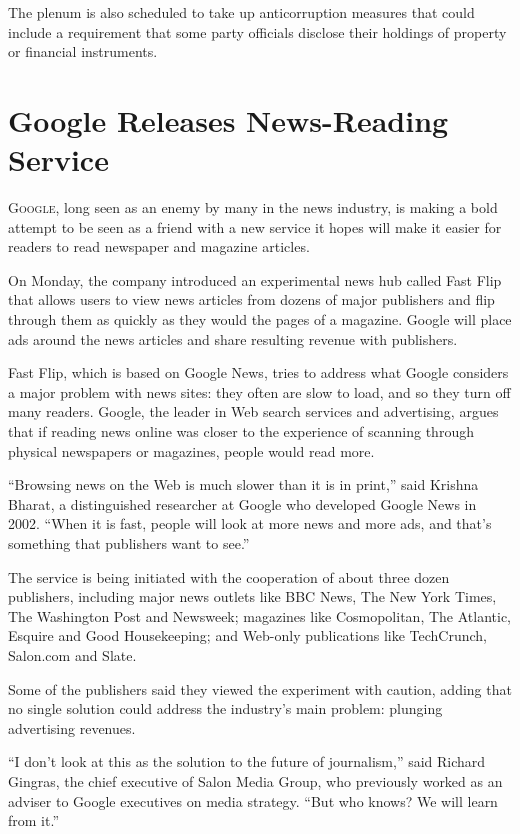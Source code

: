 ﻿\documentclass[12pt]{article}
\begin{document}
The plenum is also scheduled to take up anticorruption measures that could include a requirement
that some party officials disclose their holdings of property or financial instruments.

\section{Google Releases News-Reading Service}

\lettrine{G}{oogle}, long seen as an enemy by many in the news industry, is making a bold attempt to
be seen as a friend with a new service it hopes will make it easier for readers to read newspaper
and magazine articles.

On Monday, the company introduced an experimental news hub called Fast Flip that allows users to
view news articles from dozens of major publishers and flip through them as quickly as they would
the pages of a magazine. Google will place ads around the news articles and share resulting revenue
with publishers.

Fast Flip, which is based on Google News, tries to address what Google considers a major problem
with news sites: they often are slow to load, and so they turn off many readers. Google, the leader
in Web search services and advertising, argues that if reading news online was closer to the
experience of scanning through physical newspapers or magazines, people would read more.

``Browsing news on the Web is much slower than it is in print,'' said Krishna Bharat, a
distinguished researcher at Google who developed Google News in 2002. ``When it is fast, people will
look at more news and more ads, and that's something that publishers want to see.''

The service is being initiated with the cooperation of about three dozen publishers, including major
news outlets like BBC News, The New York Times, The Washington Post and Newsweek; magazines like
Cosmopolitan, The Atlantic, Esquire and Good Housekeeping; and Web-only publications like
TechCrunch, Salon.com and Slate.

Some of the publishers said they viewed the experiment with caution, adding that no single solution
could address the industry's main problem: plunging advertising revenues.

``I don't look at this as the solution to the future of journalism,'' said Richard Gingras, the
chief executive of Salon Media Group, who previously worked as an adviser to Google executives on
media strategy. ``But who knows? We will learn from it.''
\end{document}
